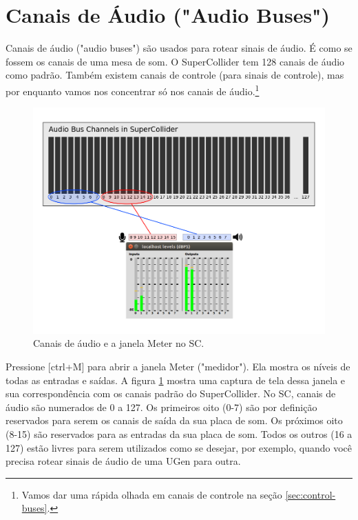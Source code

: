 \section{Canais de Áudio ("Audio Buses")}
\label{sec:audiobus}

Canais de áudio ("audio buses") são usados para rotear sinais de áudio. É como se fossem os canais de uma mesa de som. O SuperCollider tem 128 canais de áudio como padrão. Também existem canais de controle (para sinais de controle), mas por enquanto vamos nos concentrar só nos canais de áudio.\footnote{Vamos dar uma rápida olhada em canais de controle na seção \ref{sec:control-buses}.}

\begin{figure}[h!]
\centerline{
	\includegraphics[scale=0.4]{fig-audio-bus.png}}
\caption{Canais de áudio e a janela Meter no SC.}
\label{fig:audio-bus}
\end{figure}

Pressione [ctrl+M] para abrir a janela Meter ("medidor"). Ela mostra os níveis de todas as entradas e saídas. A figura \ref{fig:audio-bus} mostra uma captura de tela dessa janela e sua correspondência com os canais padrão do SuperCollider. No SC, canais de áudio são numerados de 0 a 127. Os primeiros oito (0-7) são por definição reservados para serem os canais de saída da sua placa de som. Os próximos oito (8-15) são reservados para as entradas da sua placa de som. Todos os outros (16 a 127) estão livres para serem utilizados como se desejar, por exemplo, quando você precisa rotear sinais de áudio de uma UGen para outra.

